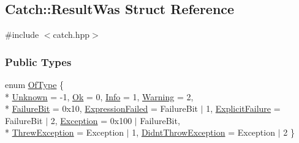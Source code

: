 \hypertarget{structCatch_1_1ResultWas}{\subsection{Catch\-:\-:Result\-Was Struct Reference}
\label{structCatch_1_1ResultWas}
}


{\ttfamily \#include $<$catch.\-hpp$>$}

\subsubsection*{Public Types}
\begin{DoxyCompactItemize}
\item 
enum \hyperlink{structCatch_1_1ResultWas_a624e1ee3661fcf6094ceef1f654601ef}{Of\-Type} \{ \\*
\hyperlink{structCatch_1_1ResultWas_a624e1ee3661fcf6094ceef1f654601efa65721dda02fe5efb522e7449e496608a}{Unknown} = -\/1, 
\hyperlink{structCatch_1_1ResultWas_a624e1ee3661fcf6094ceef1f654601efae7cbe89bb9ec7ece9b44d48b63d01b63}{Ok} = 0, 
\hyperlink{structCatch_1_1ResultWas_a624e1ee3661fcf6094ceef1f654601efa30222063929ca1b6318faa78e8242f1c}{Info} = 1, 
\hyperlink{structCatch_1_1ResultWas_a624e1ee3661fcf6094ceef1f654601efa67e9d36ba0f04a60a19896834d840c21}{Warning} = 2, 
\\*
\hyperlink{structCatch_1_1ResultWas_a624e1ee3661fcf6094ceef1f654601efa1818f1b198f10b5734c405142b22025c}{Failure\-Bit} = 0x10, 
\hyperlink{structCatch_1_1ResultWas_a624e1ee3661fcf6094ceef1f654601efa5e7126b8458dc1376ac870a719f7873f}{Expression\-Failed} = Failure\-Bit $\vert$ 1, 
\hyperlink{structCatch_1_1ResultWas_a624e1ee3661fcf6094ceef1f654601efacecfc052e2499499b13304249303cc36}{Explicit\-Failure} = Failure\-Bit $\vert$ 2, 
\hyperlink{structCatch_1_1ResultWas_a624e1ee3661fcf6094ceef1f654601efaa9107b7836cc7590ca668002f76d27c7}{Exception} = 0x100 $\vert$ Failure\-Bit, 
\\*
\hyperlink{structCatch_1_1ResultWas_a624e1ee3661fcf6094ceef1f654601efa3bb56296483947280cf7fa1ad074ab45}{Threw\-Exception} = Exception $\vert$ 1, 
\hyperlink{structCatch_1_1ResultWas_a624e1ee3661fcf6094ceef1f654601efa8b6d3d5bc78d4e7a95543b6ecfbdb57d}{Didnt\-Throw\-Exception} = Exception $\vert$ 2
 \}
\end{DoxyCompactItemize}


